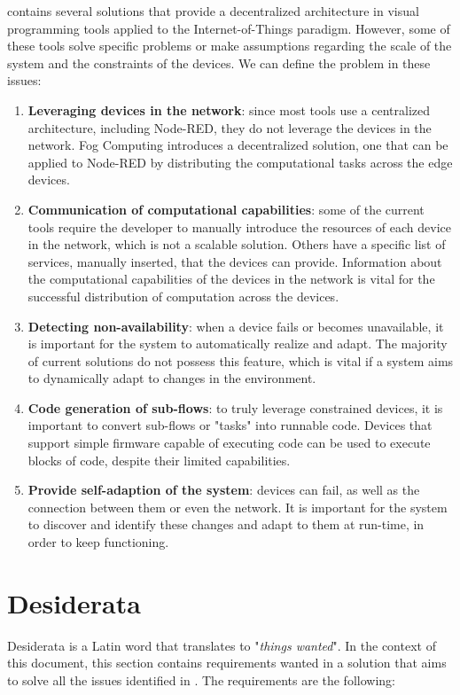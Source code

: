  contains several solutions that provide a decentralized architecture in visual programming tools applied to the Internet-of-Things paradigm. However, some of these tools solve specific problems or make assumptions regarding the scale of the system and the constraints of the devices.
We can define the problem in these issues:
\begin{enumerate}
    \item \textbf{Leveraging devices in the network}: since most tools use a centralized architecture, including Node-RED, they do not leverage the devices in the network. Fog Computing introduces a decentralized solution, one that can be applied to Node-RED by distributing the computational tasks across the edge devices.
    \item \textbf{Communication of computational capabilities}: some of the current tools require the developer to manually introduce the resources of each device in the network, which is not a scalable solution. Others have a specific list of services, manually inserted, that the devices can provide. Information about the computational capabilities of the devices in the network is vital for the successful distribution of computation across the devices.
    \item \textbf{Detecting non-availability}: when a device fails or becomes unavailable, it is important for the system to automatically realize and adapt. The majority of current solutions do not possess this feature, which is vital if a system aims to dynamically adapt to changes in the environment.
    \item \textbf{Code generation of sub-flows}: to truly leverage constrained devices, it is important to convert sub-flows or "tasks" into runnable code. Devices that support simple firmware capable of executing code can be used to execute blocks of code, despite their limited capabilities.
    \item \textbf{Provide self-adaption of the system}: devices can fail, as well as the connection between them or even the network. It is important for the system to discover and identify these changes and adapt to them at run-time, in order to keep functioning.
\end{enumerate}

\section{Desiderata}\label{sec:desiderata}
Desiderata is a Latin word that translates to "\emph{things wanted}". In the context of this document, this section contains requirements wanted in a solution that aims to solve all the issues identified in . The requirements are the following:

